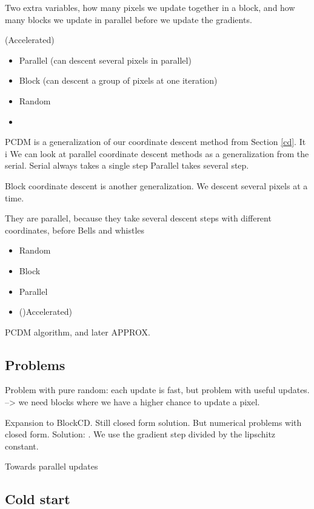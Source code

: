 Two extra variables, how many pixels we update together in a block, and how many blocks we update in parallel before we update the gradients.


(Accelerated) \cite{fercoq2015accelerated}
\begin{itemize}
	\item Parallel (can descent several pixels in parallel)
	\item Block (can descent a group of pixels at one iteration)
	
	\item Random
	\item 
\end{itemize}
PCDM is a generalization of our coordinate descent method from Section \ref{cd}. It i
We can look at parallel coordinate descent methods as a generalization from the serial.
Serial always takes a single step
Parallel takes several step.

Block coordinate descent is another generalization. We descent several pixels at a time.

They are parallel, because they take several descent steps with different coordinates, before
Bells and whistles

\begin{itemize}
	\item Random
	\item Block
	\item Parallel
	\item ()Accelerated)
\end{itemize}

PCDM algorithm, and later APPROX.

\subsection{Problems}
Problem with pure random: each update is fast, but problem with useful updates. --> we need blocks where we have a higher chance to update a pixel.

Expansion to BlockCD. Still closed form solution. But numerical problems with closed form. Solution: \cite{richtarik2014iteration}. We use the gradient step divided by the lipschitz constant.

Towards parallel updates

\subsection{Cold start}



